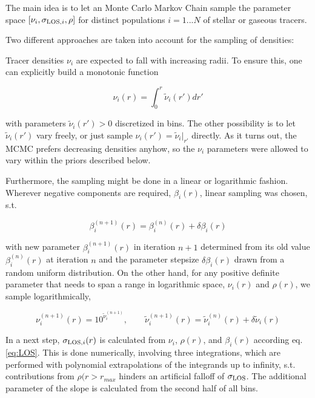 The main idea is to let an Monte Carlo Markov Chain sample the
parameter space $[\nu_i, \sigma_{\text{LOS},i}, \rho]$ for distinct populations
$i=1...N$ of stellar or gaseous tracers.

Two different approaches are taken into account for the sampling of
densities:

Tracer densities $\nu_i$ are expected to fall with increasing
radii. To ensure this, one can explicitly build a monotonic function

\begin{equation}
\nu_i(r) = \int_0^r \tilde{\nu}_i(r')dr'
\end{equation}

with parameters $\tilde{\nu}_i(r')>0$ discretized in bins. The other
possibility is to let $\tilde{\nu}_i(r')$ vary freely, or just sample
$\nu_i(r')=\tilde{\nu}_i|_{r'}$ directly. As it turns out, the MCMC
prefers decreasing densities anyhow, so the $\nu_i$ parameters were
allowed to vary within the priors described below.

Furthermore, the sampling might be done in a linear or logarithmic
fashion. Wherever negative components are required, $\beta_i(r)$,
linear sampling was chosen, s.t.

\begin{equation}
\beta_i^{(n+1)}(r) = \beta_i^{(n)}(r) + \delta\beta_i(r)
\end{equation}

with new parameter $\beta_i^{(n+1)}(r)$ in iteration $n+1$ determined
from its old value $\beta_i^{(n)}(r)$ at iteration $n$ and the
parameter stepsize $\delta\beta_i(r)$ drawn from a random uniform
distribution. On the other hand, for any positive definite parameter
that needs to span a range in logarithmic space, $\nu_i(r)$ and
$\rho(r)$, we sample logarithmically,

\begin{equation}
\nu_i^{(n+1)}(r) = 10^{\tilde{\nu}_i^{(n+1)}},\qquad \tilde{\nu}_i^{(n+1)}(r) = \tilde{\nu}_i^{(n)}(r) + \delta\tilde{\nu}_i(r)
\end{equation}

In a next step, $\sigma_{\text{LOS},i}(r)$ is calculated from $\nu_i$, $\rho(r)$, and
$\beta_i(r)$ according eq. \ref{eq:LOS}. This is done numerically,
involving three integrations, which are performed with polynomial extrapolations
of the integrands up to infinity, s.t. contributions from
$\rho(r>r_{max}$ hinders an artificial falloff of
$\sigma_{\text{LOS}}$. The additional parameter of the slope is calculated from the second 
half of all bins.

